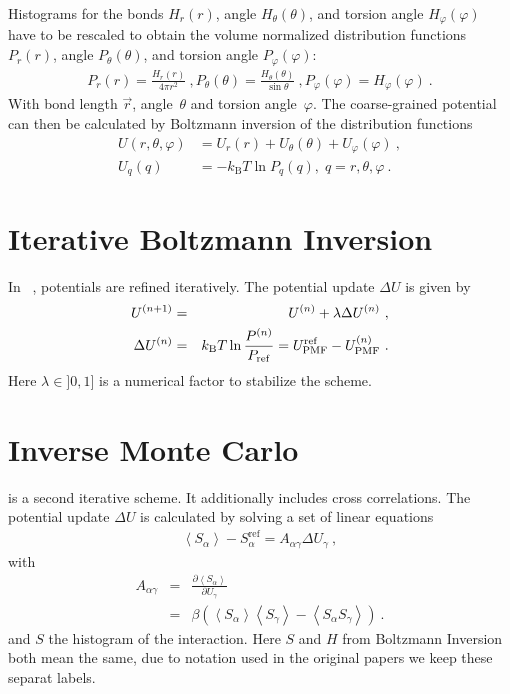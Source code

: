 Histograms for the bonds $H_r(r)$, angle $H_\theta(\theta)$, and torsion angle $H_\varphi(\varphi)$ have to be rescaled to obtain the volume normalized distribution functions $P_r(r)$, angle $P_\theta(\theta)$, and torsion angle $P_\varphi(\varphi)$: 
%
\begin{align}
    P_r(r) = \frac{H_r(r)}{4\pi r^2}~,
    P_\theta(\theta) = \frac{H_\theta(\theta)}{\sin \theta}~,
    P_\varphi(\varphi) = H_\varphi (\varphi)~.
    \label{eq:boltzmann_norm}
\end{align}
With bond length $\vec{r}$, angle~$\theta$ and torsion angle~$\varphi$.%
The coarse-grained potential can then be calculated by Boltzmann inversion of the distribution functions
%
\begin{align}
    \label{eq:boltzmann_pmf}
    U({r}, \theta, \varphi) &= U_r({r}) + U_{\theta}(\theta) + U_{\varphi}(\varphi)~, \\
    U_q({q}) &= - k_\text{B} T \ln P_q( q ),\; q=r, \theta, \varphi~.
    \nonumber
\end{align}

\section{Iterative Boltzmann Inversion}
\label{sec:ibi}

In \ibi~\cite{Reith:2003}, potentials are refined iteratively. The potential update $\Delta U$ is given by
\begin{eqnarray}
  \label{eq:iter_boltzmann}
  U^{(n+1)} &=& U^{(n)} + \lambda \Delta U^{(n)}~, \\
  \Delta U^{(n)} &=&  k_\text{B} T \ln  \frac{P^{(n)}}{P_{\rm ref}}
  =  U_\text{PMF}^\text{ref} - U_\text{PMF}^{(n)}~.
\end{eqnarray}
Here $\lambda \in ]0,1]$ is a numerical factor to stabilize the scheme.

\section{Inverse Monte Carlo}
\label{sec:imc}

\imc is a second iterative scheme. It additionally includes cross correlations. The potential update $\Delta U$ is calculated by solving a set of linear equations
\begin{align}
    \left<S_{\alpha}\right> - S_{\alpha}^{\text{ref}}= A_{\alpha \gamma} \Delta U_{\gamma}~,
  \label{eq:imc}
\end{align}
%
with
\begin{eqnarray}
  \label{eq:covariance}
  A_{\alpha \gamma} &=& \frac{\partial \left< S_{\alpha} \right> }{\partial U_{\gamma}}  \\
  \nonumber
  &=&
  \beta \left( \left<S_{\alpha} \right>\left<S_{\gamma} \right> - \left<S_{\alpha} S_{\gamma} \right>  \right)~.
  \nonumber
\end{eqnarray}
and $S$ the histogram of the interaction. Here $S$ and $H$ from Boltzmann Inversion both mean the same, due to notation used in the original papers we keep these separat labels.

